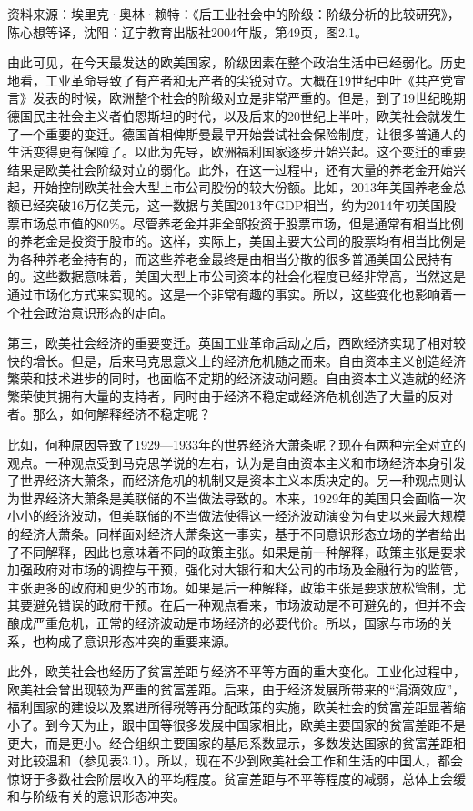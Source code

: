 资料来源：埃里克·奥林·赖特：《后工业社会中的阶级：阶级分析的比较研究》，陈心想等译，沈阳：辽宁教育出版社2004年版，第49页，图2.1。

由此可见，在今天最发达的欧美国家，阶级因素在整个政治生活中已经弱化。历史地看，工业革命导致了有产者和无产者的尖锐对立。大概在19世纪中叶《共产党宣言》发表的时候，欧洲整个社会的阶级对立是非常严重的。但是，到了19世纪晚期德国民主社会主义者伯恩斯坦的时代，以及后来的20世纪上半叶，欧美社会就发生了一个重要的变迁。德国首相俾斯曼最早开始尝试社会保险制度，让很多普通人的生活变得更有保障了。以此为先导，欧洲福利国家逐步开始兴起。这个变迁的重要结果是欧美社会阶级对立的弱化。此外，在这一过程中，还有大量的养老金开始兴起，开始控制欧美社会大型上市公司股份的较大份额。比如，2013年美国养老金总额已经突破16万亿美元，这一数据与美国2013年GDP相当，约为2014年初美国股票市场总市值的80\%。尽管养老金并非全部投资于股票市场，但是通常有相当比例的养老金是投资于股市的。这样，实际上，美国主要大公司的股票均有相当比例是为各种养老金持有的，而这些养老金最终是由相当分散的很多普通美国公民持有的。这些数据意味着，美国大型上市公司资本的社会化程度已经非常高，当然这是通过市场化方式来实现的。这是一个非常有趣的事实。所以，这些变化也影响着一个社会政治意识形态的走向。

第三，欧美社会经济的重要变迁。英国工业革命启动之后，西欧经济实现了相对较快的增长。但是，后来马克思意义上的经济危机随之而来。自由资本主义创造经济繁荣和技术进步的同时，也面临不定期的经济波动问题。自由资本主义造就的经济繁荣使其拥有大量的支持者，同时由于经济不稳定或经济危机创造了大量的反对者。那么，如何解释经济不稳定呢？

比如，何种原因导致了1929—1933年的世界经济大萧条呢？现在有两种完全对立的观点。一种观点受到马克思学说的左右，认为是自由资本主义和市场经济本身引发了世界经济大萧条，而经济危机的机制又是资本主义本质决定的。另一种观点则认为世界经济大萧条是美联储的不当做法导致的。本来，1929年的美国只会面临一次小小的经济波动，但美联储的不当做法使得这一经济波动演变为有史以来最大规模的经济大萧条。同样面对经济大萧条这一事实，基于不同意识形态立场的学者给出了不同解释，因此也意味着不同的政策主张。如果是前一种解释，政策主张是要求加强政府对市场的调控与干预，强化对大银行和大公司的市场及金融行为的监管，主张更多的政府和更少的市场。如果是后一种解释，政策主张是要求放松管制，尤其要避免错误的政府干预。在后一种观点看来，市场波动是不可避免的，但并不会酿成严重危机，正常的经济波动是市场经济的必要代价。所以，国家与市场的关系，也构成了意识形态冲突的重要来源。

此外，欧美社会也经历了贫富差距与经济不平等方面的重大变化。工业化过程中，欧美社会曾出现较为严重的贫富差距。后来，由于经济发展所带来的“涓滴效应”，福利国家的建设以及累进所得税等再分配政策的实施，欧美社会的贫富差距显著缩小了。到今天为止，跟中国等很多发展中国家相比，欧美主要国家的贫富差距不是更大，而是更小。经合组织主要国家的基尼系数显示，多数发达国家的贫富差距相对比较温和（参见表3.1）。所以，现在不少到欧美社会工作和生活的中国人，都会惊讶于多数社会阶层收入的平均程度。贫富差距与不平等程度的减弱，总体上会缓和与阶级有关的意识形态冲突。


